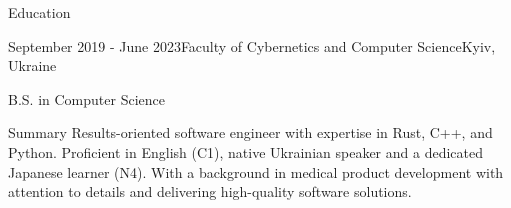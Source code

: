 \documentclass[11pt]{resume}
\begin{document}
    \begin{rSection}{Education}
        \begin{rSubsection}
            {\href{http://csc.knu.ua/en/}{\color{blue}\underline{}}}{September 2019 - June 2023}{Faculty of Cybernetics and Computer Science}{Kyiv, Ukraine}
            
            \item B.S. in Computer Science
        \end{rSubsection}
    \end{rSection}

    \begin{rSection}{Summary}
        Results-oriented software engineer with expertise in Rust, C++, and Python. Proficient in English (C1), native Ukrainian speaker and a dedicated Japanese learner (N4). With a background in medical product development with attention to details and delivering high-quality software solutions.
    \end{rSection}
\end{document}
